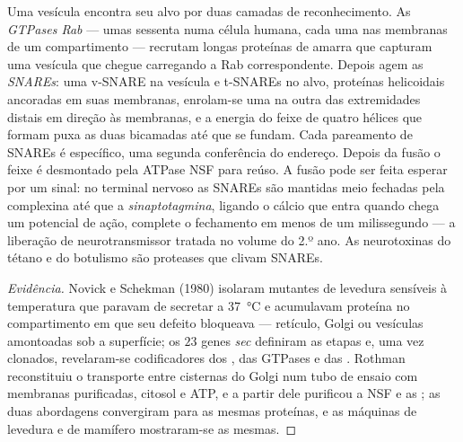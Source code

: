 \begin{definition}\label{def:b3:membrane-traffic:fusion}
Uma vesícula encontra seu alvo por duas camadas de reconhecimento. As
\emph{GTPases Rab} --- umas sessenta numa célula humana, cada uma nas
membranas de um compartimento --- recrutam longas proteínas de amarra
que capturam uma vesícula que chegue carregando a Rab correspondente.
Depois agem as \emph{SNAREs}: uma v-SNARE na vesícula e t-SNAREs no
alvo, proteínas helicoidais ancoradas em suas membranas, enrolam-se uma
na outra das extremidades distais em direção às membranas, e a energia
do feixe de quatro hélices que formam puxa as duas bicamadas até que se
fundam. Cada pareamento de SNAREs é específico, uma segunda conferência
do endereço. Depois da fusão o feixe é desmontado pela ATPase NSF para
reúso. A fusão pode ser feita esperar por um sinal: no terminal nervoso
as SNAREs são mantidas meio fechadas pela complexina até que a
\emph{sinaptotagmina}, ligando o cálcio que entra quando chega um
potencial de ação, complete o fechamento em menos de um milissegundo
--- a liberação de neurotransmissor tratada no volume do 2.º ano. As
neurotoxinas do tétano e do botulismo são proteases que clivam SNAREs.
\end{definition}

\begin{proof}[Evidência]
Novick e Schekman (1980) isolaram mutantes de levedura sensíveis à
temperatura que paravam de secretar a \qty{37}{\celsius} e acumulavam
proteína no compartimento em que seu defeito bloqueava --- retículo,
Golgi ou vesículas amontoadas sob a superfície; os $23$ genes
\emph{sec} definiram as etapas e, uma vez clonados, revelaram-se
codificadores dos , das GTPases e das . Rothman
reconstituiu o transporte entre cisternas do Golgi num tubo de ensaio
com membranas purificadas, citosol e ATP, e a partir dele purificou a
NSF e as ; as duas abordagens convergiram para as mesmas
proteínas, e as máquinas de levedura e de mamífero mostraram-se as
mesmas.
\end{proof}

